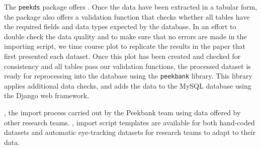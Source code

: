 \documentclass[
  english,
  man,floatsintext]{apa6}
\providecommand{\DIFaddtex}[1]{{\protect\color{blue}{#1}}} %
\providecommand{\DIFdeltex}[1]{}                      %
\providecommand{\DIFaddbegin}{} %
\providecommand{\DIFaddend}{} %
\providecommand{\DIFdelbegin}{} %
\providecommand{\DIFdelend}{} %
\providecommand{\DIFadd}[1]{\texorpdfstring{\DIFaddtex{#1}}{#1}} %
\providecommand{\DIFdel}[1]{\texorpdfstring{\DIFdeltex{#1}}{}} %
\newcommand{\DIFscaledelfig}{0.5}
\newlength{\DIFdelgraphicswidth} %
\newlength{\DIFdelgraphicsheight} %
\newcommand{\DIFaddincludegraphics}[2][]{{\color{blue}\fbox{\DIFOincludegraphics[#1]{#2}}}} %
\newcommand{\DIFdelincludegraphics}[2][]{%
\sbox{\DIFdelgraphicsbox}{\DIFOincludegraphics[#1]{#2}}%
\settoboxwidth{\DIFdelgraphicswidth}{\DIFdelgraphicsbox} %
\settoboxtotalheight{\DIFdelgraphicsheight}{\DIFdelgraphicsbox} %
\scalebox{\DIFscaledelfig}{%
\parbox[b]{\DIFdelgraphicswidth}{\usebox{\DIFdelgraphicsbox}\\[-\baselineskip] \rule{\DIFdelgraphicswidth}{0em}}\llap{\resizebox{\DIFdelgraphicswidth}{\DIFdelgraphicsheight}{%
\setlength{\unitlength}{\DIFdelgraphicswidth}%
\begin{picture}(1,1)%
\thicklines\linethickness{2pt} %
{\color[rgb]{1,0,0}\put(0,0){\framebox(1,1){}}}%
{\color[rgb]{1,0,0}\put(0,0){\line( 1,1){1}}}%
{\color[rgb]{1,0,0}\put(0,1){\line(1,-1){1}}}%
\end{picture}%
}\hspace*{3pt}}} %
} %
\DeclareRobustCommand{\DIFaddbegin}{\DIFOaddbegin \let\includegraphics\DIFaddincludegraphics} %
\DeclareRobustCommand{\DIFaddend}{\DIFOaddend \let\includegraphics\DIFOincludegraphics} %
\DeclareRobustCommand{\DIFdelbegin}{\DIFOdelbegin \let\includegraphics\DIFdelincludegraphics} %
\DeclareRobustCommand{\DIFdelend}{\DIFOaddend \let\includegraphics\DIFOincludegraphics} %
\begin{document}
\DIFadd{Many of the specific operations involved in importing a dataset can be abstracted across datasets.
}\DIFaddend The \texttt{peekds} package offers \DIFdelbegin \DIFdel{functions to extract the above data}\DIFdelend \DIFaddbegin \DIFadd{a library of these functions}\DIFaddend .
Once the data have been extracted in a tabular form, the package also offers a validation function that checks whether all tables have the required fields and data types expected by the database.
In an effort to double check the data quality and to make sure that no errors are made in the importing script, we \DIFdelbegin \DIFdel{create a }\DIFdelend \DIFaddbegin \DIFadd{also typically perform a visual check of the import process, creating a }\DIFaddend time course plot \DIFdelbegin \DIFdel{based on our processed tables }\DIFdelend to replicate the results in the paper that first presented each dataset\DIFdelbegin \DIFdel{as part of the import procedure}\DIFdelend .
Once this plot has been created and checked for consistency and all tables pass our validation functions, the processed dataset is ready for reprocessing into the database using the \texttt{peekbank} library.
This library applies additional data checks, and adds the data to the MySQL database using the Django web framework.

\DIFdelbegin \DIFdel{Currently}\DIFdelend \DIFaddbegin \DIFadd{To date}\DIFaddend , the import process \DIFdelbegin \DIFdel{is }\DIFdelend \DIFaddbegin \DIFadd{has been }\DIFaddend carried out by the Peekbank team using data offered by other research teams.
\DIFdelbegin \DIFdel{In the future, we hope to allow research teams to carry out their own import processes with checks from the Peekbank team before reprocessing.
To this end}\DIFdelend \DIFaddbegin \DIFadd{Data contributors are also welcome to provide import scripts to facilitate contribution.
However, creating these scripts requires familiarity with both R scripting and the specific Peekbank schema, and writing an import script can be somewhat time-consuming in practice.
To support future data contributions}\DIFaddend , import script templates \DIFaddbegin \DIFadd{and examples }\DIFaddend are available for both hand-coded datasets and automatic eye-tracking datasets for research teams to adapt to their data.
\DIFaddbegin \DIFadd{These import templates walk researchers through each step of data processing using example datasets from Peekbank and include explanations of key decision points, examples of how to use various helper functions available in }\texttt{\DIFadd{peekds}}\DIFadd{, and further details about the database schema.
}\DIFaddend 
\end{document}
